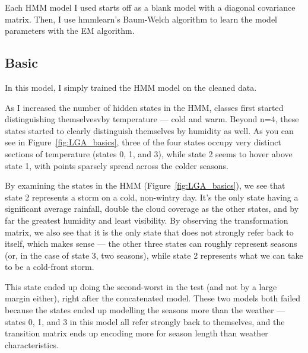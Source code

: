 \documentclass[a4paper]{article}
\begin{document}
Each HMM model I used starts off as a blank model with a diagonal covariance matrix. Then, I use hmmlearn's Baum-Welch algorithm to learn the model parameters with the EM algorithm.


\subsection{Basic}

In this model, I simply trained the HMM model on the cleaned data.

As I increased the number of hidden states in the HMM, classes first started distinguishing themselvesvby temperature --- cold and warm. Beyond n=4, these states started to clearly distinguish themselves by humidity as well. As you can see in Figure~\ref{fig:LGA_basics}, three of the four states occupy very distinct sections of temperature (states 0, 1, and 3), while state 2 seems to hover above state 1, with points sparsely spread across the colder seasons.

By examining the states in the HMM (Figure~\ref{fig:LGA_basics}), we see that state 2 represents a storm on a cold, non-wintry day. It's the only state having a significant average rainfall, double the cloud coverage as the other states, and by far the greatest humidity and least visibility. By observing the transformation matrix, we also see that it is the only state that does not strongly refer back to itself, which makes sense --- the other three states can roughly represent seasons (or, in the case of state 3, two seasons), while state 2 represents what we can take to be a cold-front storm.

This state ended up doing the second-worst in the test (and not by a large margin either), right after the concatenated model. These two models both failed because the states ended up modelling the seasons more than the weather --- states 0, 1, and 3 in this model all refer strongly back to themselves, and the transition matrix ends up encoding more for season length than weather characteristics.
\end{document}
